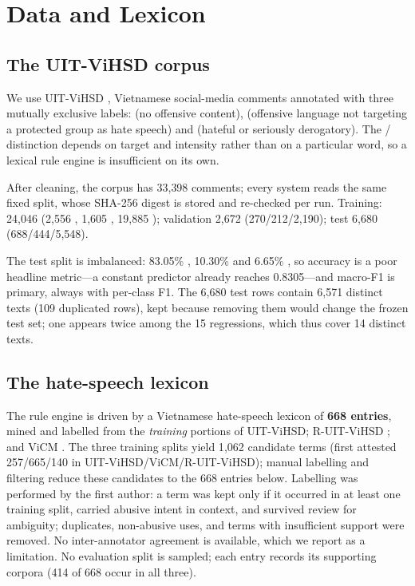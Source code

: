 \section{Data and Lexicon}

\label{sec:data}

\subsection{The UIT-ViHSD corpus}

\label{sec:vihsd}

We use UIT-ViHSD \cite{luu2021vihsd}, Vietnamese social-media comments annotated
with three mutually exclusive labels: \clean{} (no offensive content), \off{}
(offensive language not targeting a protected group as hate speech) and \hate{}
(hateful or seriously derogatory). The \off{}/\hate{} distinction depends on target
and intensity rather than on a particular word, so a lexical rule engine is
insufficient on its own.

After cleaning, the corpus has 33{,}398 comments; every system reads the same fixed
split, whose SHA-256 digest is stored and re-checked per run. Training: 24{,}046
(2{,}556 \hate{}, 1{,}605 \off{}, 19{,}885 \clean{}); validation 2{,}672
(270/212/2{,}190); test 6{,}680 (688/444/5{,}548).

The test split is imbalanced: 83.05\% \clean{}, 10.30\% \hate{} and 6.65\% \off{},
so accuracy is a poor headline metric---a constant \clean{} predictor already reaches
0.8305---and macro-F1 is primary, always with per-class F1. The 6{,}680 test rows
contain 6{,}571 distinct texts (109 duplicated rows), kept because removing them would
change the frozen test set; one appears twice among the 15 regressions, which thus
cover 14 distinct texts.

\subsection{The hate-speech lexicon}

\label{sec:lexicon}

The rule engine is driven by a Vietnamese hate-speech lexicon of \textbf{668 entries},
mined and labelled from the \emph{training} portions of UIT-ViHSD; R-UIT-ViHSD
\cite{bontoriTdtu}; and ViCM \cite{nguyen2026vicm}. The three training splits yield
1{,}062 candidate terms (first attested 257/665/140 in UIT-ViHSD/ViCM/R-UIT-ViHSD); manual labelling and
filtering reduce these candidates to the 668 entries below. Labelling was performed by the first author:
a term was kept only if it occurred in at least one training split, carried abusive intent in context,
and survived review for ambiguity; duplicates, non-abusive uses, and terms with insufficient support
were removed. No inter-annotator agreement is available, which we report as a limitation. No evaluation split is sampled; each entry records
its supporting corpora (414 of 668 occur in all three).

